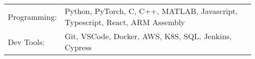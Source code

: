 \begin{tabularx}{\linewidth}{@{}l X@{}}
Programming: &  \normalsize{Python, PyTorch, C, C++, MATLAB, Javascript, Typescript, React, ARM Assembly}\\
Dev Tools:  &  \normalsize{Git, VSCode, Docker, AWS, K8S, SQL, Jenkins, Cypress}\\
\end{tabularx}